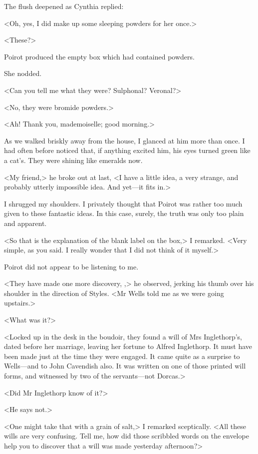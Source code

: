  The flush deepened as Cynthia replied: 

 <Oh, yes, I did make up some sleeping powders for her once.> 

 <These?> 

 Poirot produced the empty box which had contained powders. 

 She nodded. 

 <Can you tell me what they were? Sulphonal? Veronal?> 

 <No, they were bromide powders.> 

 <Ah! Thank you, mademoiselle; good morning.> 

 As we walked briskly away from the house, I glanced at him more than once. I had often before noticed that, if anything excited him, his eyes turned green like a cat's. They were shining like emeralds now. 

 <My friend,> he broke out at last, <I have a little idea, a very strange, and probably utterly impossible idea. And yet—it fits in.> 

 I shrugged my shoulders. I privately thought that Poirot was rather too much given to these fantastic ideas. In this case, surely, the truth was only too plain and apparent. 

 <So that is the explanation of the blank label on the box,> I remarked. <Very simple, as you said. I really wonder that I did not think of it myself.> 

 Poirot did not appear to be listening to me. 

 <They have made one more discovery, ,> he observed, jerking his thumb over his shoulder in the direction of Styles. <Mr Wells told me as we were going upstairs.> 

 <What was it?> 

 <Locked up in the desk in the boudoir, they found a will of Mrs Inglethorp's, dated before her marriage, leaving her fortune to Alfred Inglethorp. It must have been made just at the time they were engaged. It came quite as a surprise to Wells—and to John Cavendish also. It was written on one of those printed will forms, and witnessed by two of the servants—not Dorcas.> 

 <Did Mr Inglethorp know of it?> 

 <He says not.> 

 <One might take that with a grain of salt,> I remarked sceptically. <All these wills are very confusing. Tell me, how did those scribbled words on the envelope help you to discover that a will was made yesterday afternoon?> 

